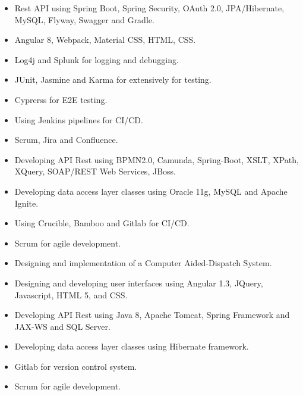 \documentclass[10pt,a4paper,ragged2e]{altacv}
\begin{document}
\begin{itemize}
    \item Rest API using Spring Boot, Spring Security, OAuth 2.0, JPA/Hibernate, MySQL, Flyway, Swagger and Gradle.
    \item Angular 8, Webpack, Material CSS, HTML, CSS.
    \item Log4j and Splunk for logging and debugging.
    \item JUnit, Jasmine and Karma for extensively for testing.
    \item Cyprerss for E2E testing.
    \item Using Jenkins pipelines for CI/CD.
    \item Scrum, Jira and Confluence.
\end{itemize}

\vspace{10px}

\begin{itemize}
    \item Developing API Rest using BPMN2.0, Camunda, Spring-Boot, XSLT, XPath, XQuery, SOAP/REST Web Services, JBoss.
    \item Developing data access layer classes using Oracle 11g, MySQL and Apache Ignite.
    \item Using Crucible, Bamboo and Gitlab for CI/CD.
    \item Scrum for agile development.
\end{itemize}

\vspace{10px}

\begin{itemize}
   \item Designing and implementation of a Computer Aided-Dispatch System.
   \item Designing and developing user interfaces using  Angular 1.3, JQuery, Javascript, HTML 5, and CSS.
   \item Developing API Rest using Java 8, Apache Tomcat, Spring Framework and JAX-WS and SQL Server.
   \item Developing data access layer classes using Hibernate framework.
   \item Gitlab for version control system.
   \item Scrum for agile development.
\end{itemize}
\end{document}
